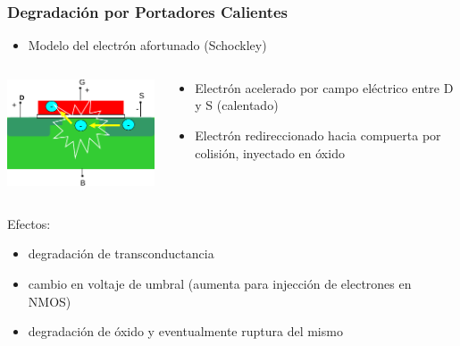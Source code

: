 \documentclass[t,aspectratio=169,10pt]{beamer}
\begin{document}
\begin{frame}
\frametitle{Degradación por Portadores Calientes}
\begin{itemize}
	\item Modelo del electrón afortunado (Schockley)
\end{itemize}

\begin{columns}

	\begin{column}{0.5\textwidth}
 
		\centering
		\includegraphics[width=6.5cm]{hot-carriers}
  
	\end{column}
 
	\begin{column}{0.5\textwidth}
 
		\begin{itemize}
			\item Electrón acelerado por campo eléctrico entre D y S (calentado)
			\item Electrón redireccionado hacia compuerta por colisión, inyectado en óxido
		\end{itemize}
  
	\end{column}
 
\end{columns}

Efectos: 

\begin{itemize}
	\item degradación de transconductancia
	\item cambio en voltaje de umbral (aumenta para injección de electrones en NMOS)
	\item degradación de óxido y eventualmente ruptura del mismo
\end{itemize}
\end{frame}
\end{document}
